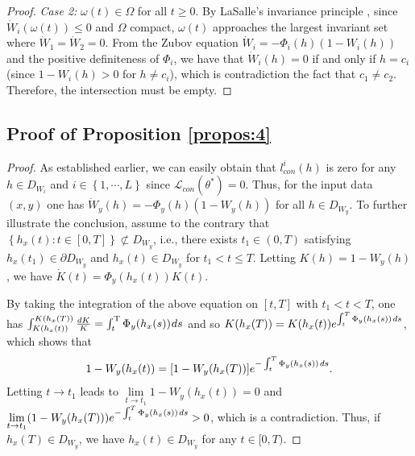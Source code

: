 \documentclass[journal]{IEEEtran}
\begin{document}
{\begin{proof}
	\textit{Case 2:} $\omega(t) \in \Omega$ for all $t \geq 0$. By LaSalle's invariance principle \cite{Khalil:1173048}, since $\dot{W}_i(\omega(t)) \leq 0$ and $\Omega$ compact, $\omega(t)$ approaches the largest invariant set where $\dot{W}_1 = \dot{W}_2 = 0$. From the Zubov equation $ \dot{W}_i = -\Phi_i(h)(1-W_i(h))$ and the positive definiteness of $\Phi_i$, we have that $\dot{W}_i(h) = 0$ if and only if $h = c_i$ (since $1-W_i(h) > 0$ for $h \ne c_i$), which is contradiction the fact that $c_1 \ne c_2$. Therefore, the intersection must be empty.
\end{proof}


\subsection{Proof of Proposition \ref{propos:4}}
\label{app:pro5}

\begin{proof}
As established earlier, we can easily obtain that $l_{con}^i(h)$ is zero for any $h \in D_{W_i}$ and $i \in \left\{ {1, \cdots ,L} \right\}$ since \( \mathcal{L}_{con}(\theta^*) = 0 \).  Thus, for the input data $(x,y)$ one has ${\dot W_y}(h) =  - {\Phi _y}(h)(1 - {W_y}(h))$ for all  $h \in D_{W_y}$. To further illustrate the conclusion,  assume to the contrary that  $\left\{ {{h_x}\left( t \right):t \in \left[ {0,T} \right]} \right\}  \not\subset  D_{W_y} $, i.e., there exists $t_1\in (0,T)$ satisfying $h_x(t_1) \in \partial D_{W_y}$ and $h_x(t) \in  D_{W_y}$ for  $t_1< t \le T$. Letting $K(h) = 1- W_y(h)$, we have $\dot{K}(t) = \Phi_y(h_x(t))K(t)$. 

By taking the integration of the above equation on $[t,T]$ with $t_1<t<T$, one has $ \int_{{K(h_x(t))}}^{{K(h_x(T))}} {\frac{{dK}}{K}} = \int_t^{\rm{T}} {{\Phi _y}({h_x}(s))} {\mkern 1mu} ds$ and so $K(h_x(T))  = K(h_x(t)){e^{\int_t^T {{\Phi _y}({h_x}(s))} {\kern 1pt} ds}}$, which shows that 
\begin{equation*}
	1 - {W_y}(h_x(t))  = [1 - {W_y}(h_x(T))]{e^{ - \int_{{t}}^T \Phi_y(h_x(s)){\kern 1pt} ds}}.
\end{equation*}
Letting $t \to t_1$ leads to $ \mathop {\lim }\limits_{t \to {t_1}}1 - {W_y}(h_x(t)) = 0$ and $ \mathop {\lim }\limits_{t \to {t_1}} (1 - {W_y}(h_x(T))){e^{ - \int_{{t}}^T  \Phi_y(h_x(s)) {\kern 1pt} ds}} > 0$, which is a contradiction. Thus, if $h_x(T)\in D_{W_y}$, we have $h_x(t) \in D_{W_y}$ for any $t\in [0,T)$.
\end{proof}


}
\end{document}
